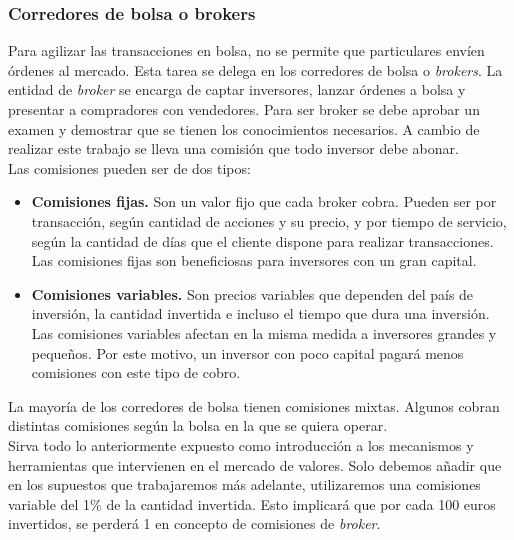 		\subsubsection{Corredores de bolsa o brokers}
		
		Para agilizar las transacciones en bolsa, no se permite que particulares env\'ien \'ordenes al mercado. Esta tarea se delega en los corredores de bolsa o \textit{brokers}. La entidad de \textit{broker} se encarga de captar inversores, lanzar \'ordenes a bolsa y presentar a compradores con vendedores. Para ser broker se debe aprobar un examen y demostrar que se tienen los conocimientos necesarios. A cambio de realizar este trabajo se lleva una comisi\'on que todo inversor debe abonar. \\
		
		Las comisiones pueden ser de dos tipos:\\
		
		\begin{itemize}
			\item \textbf{Comisiones fijas.} Son un valor fijo que cada broker cobra. Pueden ser por transacci\'on, seg\'un cantidad de acciones y su precio, y por tiempo de servicio, seg\'un la cantidad de d\'ias que el cliente dispone para realizar transacciones. Las comisiones fijas son beneficiosas para inversores con un gran capital.
			
			\item \textbf{Comisiones variables.} Son precios variables que dependen del país de inversión, la cantidad invertida e incluso el tiempo que dura una inversi\'on. Las comisiones variables afectan en la misma medida a inversores grandes y peque\~nos. Por este motivo, un inversor con poco capital pagar\'a menos comisiones con este tipo de cobro.
		\end{itemize}
		
		La mayor\'ia de los corredores de bolsa tienen comisiones mixtas. Algunos cobran distintas comisiones seg\'un la bolsa en la que se quiera operar. \\
		
		Sirva todo lo anteriormente expuesto como introducci\'on a los mecanismos y herramientas que intervienen en el mercado de valores. Solo debemos a\~nadir que en los supuestos que trabajaremos m\'as adelante, utilizaremos una comisiones variable del 1\% de la cantidad invertida. Esto implicar\'a que por cada 100 euros invertidos, se perder\'a 1 en concepto de comisiones de \textit{broker}.\\



